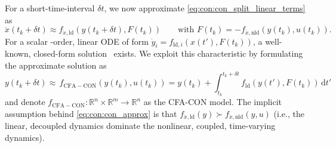 For a short-time-interval $\delta t$, we now approximate \eqref{eq:con:con_split_linear_terms} as
\begin{equation}\label{eq:con:con_approx}
    \ddot{x}(t_k+\delta t) \approx f_{\ddot{x}, \mathrm{ld}}(y(t_k+\delta t), F(t_k)) 
    \qquad \text{with  }
    F(t_k) =  -f_{\ddot{x}, \mathrm{nld}}(y(t_k), u(t_k)).
\end{equation}
For a scalar -order, linear \gls{ODE} of form $\dot{y}_i = f_{\mathrm{ld},i}(x(t'), F(t_k))$, a well-known, closed-form solution~\cite{Pas2023damped} exists.
We exploit this characteristic by formulating the approximate solution as 
\begin{equation}\label{eq:con:cfa_con}
    y(t_k + \delta t) \approx \, f_\mathrm{CFA-CON}(y(t_k), u(t_k)) =  y(t_k) + \int_{t_k}^{t_k + \delta t} f_{\mathrm{ld}}(y(t'), F(t_k)) \, \mathrm{d}t'
\end{equation}
and denote $f_\mathrm{CFA-CON}: \mathbb{R}^n \times \mathbb{R}^m \to \mathbb{R}^n$ as the \gls{CFA-CON} model.
The implicit assumption behind \eqref{eq:con:con_approx} is that $f_{\ddot{x}, \mathrm{ld}}(y) \succ f_{\ddot{x}, \mathrm{nld}}(y, u)$ (i.e., the linear, decoupled dynamics dominate the nonlinear, coupled, time-varying dynamics).



